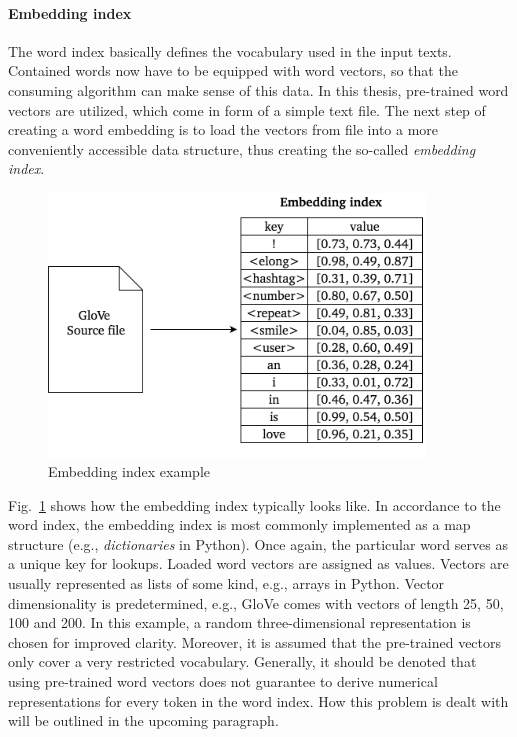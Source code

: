 \paragraph{Embedding index}
\label{sub:embedding_index}

The word index basically defines the vocabulary used in the input texts.
Contained words now have to be equipped with word vectors, so that the
consuming algorithm can make sense of this data.
In this thesis, pre-trained word vectors are utilized, which come in form of a
simple text file.
The next step of creating a word embedding is to load the vectors from file
into a more conveniently accessible data structure, thus creating the so-called
\textit{embedding index}.

\begin{figure}[h]
  \includegraphics[height=7cm]{img/text_preprocessing_4}
  \caption{Embedding index example}
\label{fig:embedding_index}
\end{figure}

Fig.~\ref{fig:embedding_index} shows how the embedding index typically looks
like.
In accordance to the word index, the embedding index is most commonly implemented
as a map structure (e.g., \textit{dictionaries} in Python).
Once again, the particular word serves as a unique key for lookups.
Loaded word vectors are assigned as values.
Vectors are usually represented as lists of some kind, e.g., arrays in Python.
Vector dimensionality is predetermined, e.g., GloVe comes with vectors of length
25, 50, 100 and 200.
In this example, a random three-dimensional representation is chosen for improved clarity.
Moreover, it is assumed that the pre-trained vectors only cover a very restricted
vocabulary.
Generally, it should be denoted that using pre-trained word vectors does not guarantee
to derive numerical representations for every token in the word index.
How this problem is dealt with will be outlined in the upcoming paragraph.


